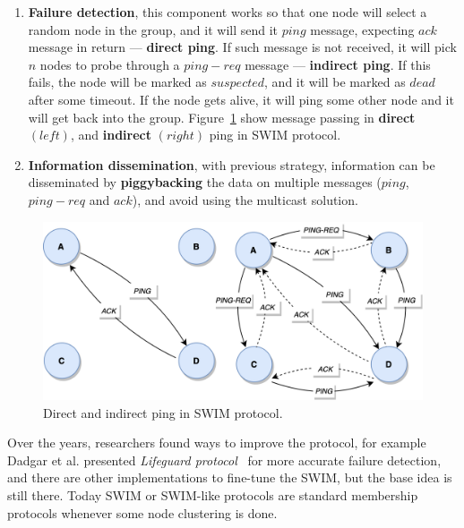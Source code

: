 \begin{enumerate}[start=1,label={(\bfseries \arabic*)}]
	\item \textbf{Failure detection}, this component works so that one node will select a random node in the group, and it will send it $ping$ message, expecting $ack$ message in return --- \textbf{direct ping}. If such message is not received, it will pick $n$ nodes to probe through a $ping-req$ message --- \textbf{indirect ping}. If this fails, the node will be marked as $suspected$, and it will be marked as $dead$ after some timeout. If the node gets alive, it will ping some other node and it will get back into the group. Figure~\ref{fig:fig15} show message passing in \textbf{direct} $(left)$, and \textbf{indirect} $(right)$ ping in SWIM protocol.
	\item \textbf{Information dissemination}, with previous strategy, information can be disseminated by \textbf{piggybacking} the data on multiple messages ($ping$, $ping-req$ and $ack$), and avoid using the multicast solution.
\end{enumerate}

\begin{figure}[H]
	\begin{center}
		\includegraphics[scale=0.7]{images/Figure15}
	\end{center}
	\vspace{-0.6cm}
	\caption{Direct and indirect ping in SWIM protocol.}
	\label{fig:fig15}
\end{figure}

\noindent
Over the years, researchers found ways to improve the protocol, for example Dadgar et al. presented \textit{Lifeguard protocol}~\cite{DadgarPC18} for more accurate failure detection, and there are other implementations to fine-tune the SWIM, but the base idea is still there. Today SWIM or SWIM-like protocols are standard membership protocols whenever some node clustering is done.
%
%
